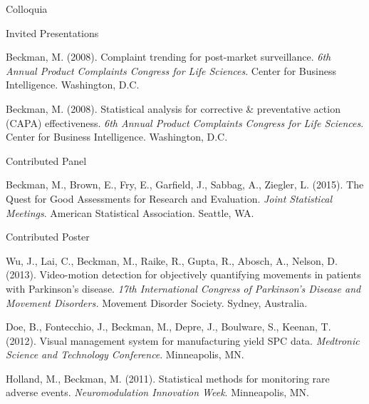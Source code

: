 \documentclass{resume} %
\begin{document}
\begin{rSection}{Colloquia}
\begin{rSubsection}{Invited Presentations}{}{}{}
		\item[] Beckman, M. (2008). Complaint trending for post-market surveillance. \textit{6th Annual Product Complaints Congress for Life Sciences}. Center for Business Intelligence. Washington, D.C. \vspace{0.5em}
		
		\item[] Beckman, M. (2008). Statistical analysis for corrective \& preventative action (CAPA) effectiveness. \textit{6th Annual Product Complaints Congress for Life Sciences}. Center for Business Intelligence. Washington, D.C. \vspace{0.5em}

			
	\end{rSubsection}	

	\begin{rSubsection}{Contributed Panel}{}{}{}
		
		\item[] Beckman, M., Brown, E., Fry, E., Garfield, J., Sabbag, A., Ziegler, L. (2015). The Quest for Good Assessments for Research and Evaluation. \textit{Joint Statistical Meetings}. American Statistical Association. Seattle, WA. \vspace{0.5em}
		
	\end{rSubsection}

	
	\begin{rSubsection}{Contributed Poster}{}{}{}
		
		\item[] Wu, J., Lai, C., Beckman, M., Raike, R., Gupta, R., Abosch, A., Nelson, D. (2013). Video-motion detection for objectively quantifying movements in patients with Parkinson's disease. \textit{17th International Congress of Parkinson's Disease and Movement Disorders.} Movement Disorder Society. Sydney, Australia. \vspace{0.5em}
		
		\item[] Doe, B., Fontecchio, J., Beckman, M., Depre, J., Boulware, S., Keenan, T. (2012). Visual management system for manufacturing yield SPC data. \textit{Medtronic Science and Technology Conference}. Minneapolis, MN. \vspace{0.5em}
		
		\item[] Holland, M., Beckman, M. (2011). Statistical methods for monitoring rare adverse events. \textit{Neuromodulation Innovation Week}. Minneapolis, MN.   \vspace{0.5em}
		

\end{rSubsection}
\end{rSection}
\end{document}
